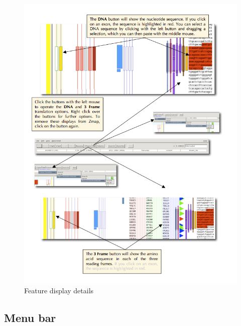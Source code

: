 \documentclass[letterpaper]{article}
\begin{document}
\begin{figure}
\centering
\color[rgb]{0.30980393,0.5058824,0.7411765}
\includegraphics[width=15.231cm]{images/feature_display_details.png}
\caption{Feature display details}
\label{img_feature_display_details}
\end{figure}


\subsection{Menu bar}
\end{document}
